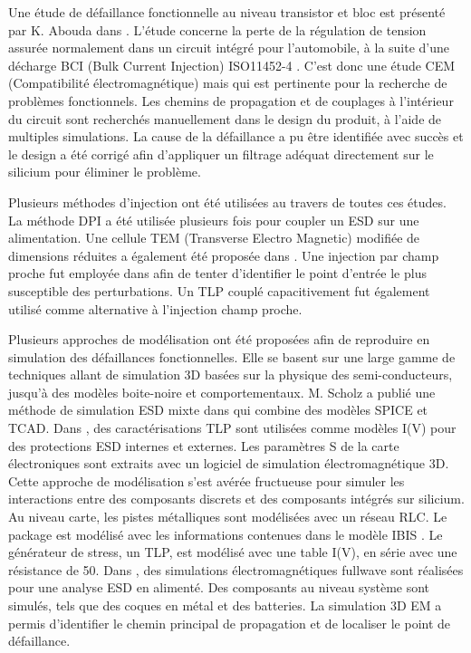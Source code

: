 Une étude de défaillance fonctionnelle au niveau transistor et bloc est présenté par K. Abouda dans \cite{softfailEMCIC}.
L'étude concerne la perte de la régulation de tension assurée normalement dans un circuit intégré pour l'automobile, à la suite d'une décharge BCI (Bulk Current Injection) ISO11452-4 \cite{iso11452}.
C'est donc une étude CEM (Compatibilité électromagnétique) mais qui est pertinente pour la recherche de problèmes fonctionnels.
Les chemins de propagation et de couplages à l'intérieur du circuit sont recherchés manuellement dans le design du produit, à l'aide de multiples simulations.
La cause de la défaillance a pu être identifiée avec succès et le design a été corrigé afin d'appliquer un filtrage adéquat directement sur le silicium pour éliminer le problème.

Plusieurs méthodes d'injection ont été utilisées au travers de toutes ces études.
La méthode DPI \cite{iec62132-4} a été utilisée plusieurs fois pour coupler un ESD sur une alimentation.
Une cellule TEM (Transverse Electro Magnetic) modifiée de dimensions réduites a également été proposée dans \cite{SDRAMCase}.
Une injection par champ proche fut employée dans \cite{softFailLCD} afin de tenter d'identifier le point d'entrée le plus susceptible des perturbations.
Un TLP couplé capacitivement fut également utilisé comme alternative à l'injection champ proche.

Plusieurs approches de modélisation ont été proposées afin de reproduire en simulation des défaillances fonctionnelles.
Elle se basent sur une large gamme de techniques allant de simulation 3D basées sur la physique des semi-conducteurs, jusqu'à des modèles boite-noire et comportementaux.
M. Scholz a publié une méthode de simulation ESD mixte dans \cite{mixedModeESDSims} qui combine des modèles SPICE et TCAD.
Dans \cite{usb2ESDProtection}, des caractérisations TLP sont utilisées comme modèles I(V) pour des protections ESD internes et externes.
Les paramètres S de la carte électroniques sont extraits avec un logiciel de simulation électromagnétique 3D.
Cette approche de modélisation s'est avérée fructueuse pour simuler les interactions entre des composants discrets et des composants intégrés sur silicium.
Au niveau carte, les pistes métalliques sont modélisées avec un réseau RLC.
Le package est modélisé avec les informations contenues dans le modèle IBIS \cite{ibis-spec}.
Le générateur de stress, un TLP, est modélisé avec une table I(V), en série avec une résistance de 50\textOmega{}.
Dans \cite{softFailMobile}, des simulations électromagnétiques fullwave sont réalisées pour une analyse ESD en alimenté.
Des composants au niveau système sont simulés, tels que des coques en métal et des batteries.
La simulation 3D EM a permis d'identifier le chemin principal de propagation et de localiser le point de défaillance.

